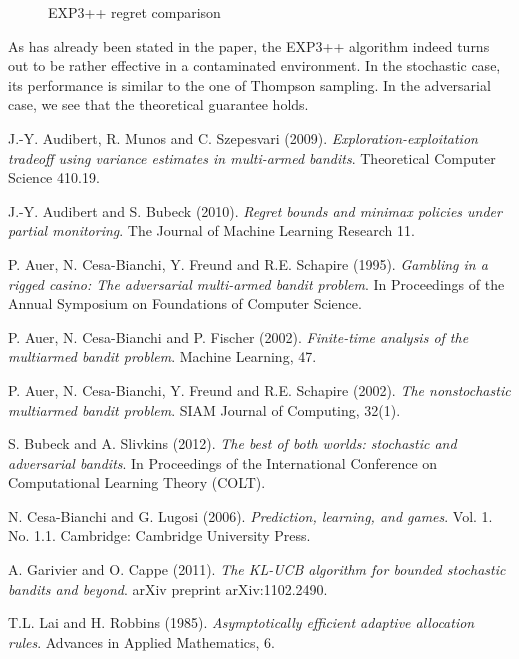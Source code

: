 \documentclass[10.5pt]{article}
\begin{document}
\begin{figure}[H]
  \label{fig:awesome_image3}
\endminipage
\caption{EXP3++ regret comparison}
\end{figure} 

As has already been stated in the paper, the EXP3++ algorithm indeed turns out to be rather effective in a contaminated environment. In the stochastic case, its performance is similar to the one of Thompson sampling. In the adversarial case, we see that the theoretical guarantee holds.


\pagebreak

\begin{thebibliography}{1}

 J.-Y. Audibert, R. Munos and C. Szepesvari (2009). {\em Exploration-exploitation tradeoff using variance estimates in multi-armed bandits}.  Theoretical Computer Science 410.19.

 J.-Y. Audibert and S. Bubeck (2010). {\em Regret bounds and minimax policies under partial monitoring}.  The Journal of Machine Learning Research 11.

 P. Auer, N. Cesa-Bianchi, Y. Freund and R.E. Schapire (1995). {\em Gambling in a rigged casino: The adversarial multi-armed bandit problem}. In Proceedings of the Annual Symposium on Foundations of Computer Science.

 P. Auer, N. Cesa-Bianchi and P. Fischer (2002). {\em Finite-time analysis of the multiarmed bandit problem}. Machine Learning, 47.

 P. Auer, N. Cesa-Bianchi, Y. Freund and R.E. Schapire (2002). {\em The nonstochastic multiarmed bandit problem}. SIAM Journal of Computing, 32(1).

 S. Bubeck and A. Slivkins (2012). {\em The best of both worlds: stochastic and adversarial bandits}. In Proceedings of the International Conference on Computational Learning Theory (COLT).

 N. Cesa-Bianchi and G. Lugosi (2006). {\em Prediction, learning, and games}. Vol. 1. No. 1.1. Cambridge: Cambridge University Press.

 A. Garivier and O. Cappe (2011). {\em The KL-UCB algorithm for bounded stochastic bandits and beyond}. arXiv preprint arXiv:1102.2490.

 T.L. Lai and H. Robbins (1985). {\em Asymptotically efficient adaptive allocation rules}. Advances in Applied Mathematics, 6.


\end{thebibliography}
\end{document}
